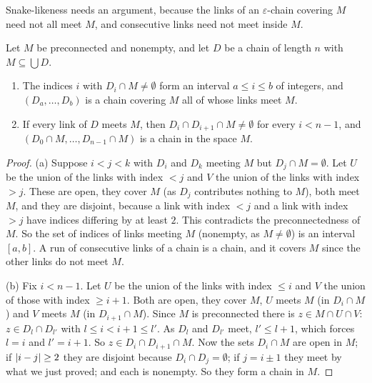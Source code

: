 
Snake-likeness needs an argument, because the links of an $\varepsilon$-chain covering $M$ need not
all meet $M$, and consecutive links need not meet inside $M$.

\begin{lemma}\label{lem:cover-meeting}
Let $M$ be preconnected and nonempty, and let $D$ be a chain of length $n$ with $M\subseteq\bigcup D$.
\begin{enumerate}[label=(\alph*)]
\item The indices $i$ with $D_i\cap M\neq\emptyset$ form an interval $a\le i\le b$ of integers, and
$(D_a,\dots,D_b)$ is a chain covering $M$ all of whose links meet $M$.
\item If every link of $D$ meets $M$, then $D_i\cap D_{i+1}\cap M\neq\emptyset$ for every $i<n-1$, and
$(D_0\cap M,\dots,D_{n-1}\cap M)$ is a chain in the space $M$.
\end{enumerate}
\end{lemma}

\begin{proof}
(a) Suppose $i<j<k$ with $D_i$ and $D_k$ meeting $M$ but $D_j\cap M=\emptyset$. Let $U$ be the union of
the links with index $<j$ and $V$ the union of the links with index $>j$. These are open, they cover
$M$ (as $D_j$ contributes nothing to $M$), both meet $M$, and they are disjoint, because a link with
index $<j$ and a link with index $>j$ have indices differing by at least $2$. This contradicts the
preconnectedness of $M$. So the set of indices of links meeting $M$ (nonempty, as $M\ne\emptyset$) is an
interval $[a,b]$. A run of consecutive links of a chain is a chain, and it covers $M$ since the other
links do not meet $M$.

(b) Fix $i<n-1$. Let $U$ be the union of the links with index $\le i$ and $V$ the union of those with
index $\ge i+1$. Both are open, they cover $M$, $U$ meets $M$ (in $D_i\cap M$) and $V$ meets $M$ (in
$D_{i+1}\cap M$). Since $M$ is preconnected there is $z\in M\cap U\cap V$: $z\in D_l\cap D_{l'}$ with
$l\le i<i+1\le l'$. As $D_l$ and $D_{l'}$ meet, $l'\le l+1$, which forces $l=i$ and $l'=i+1$. So
$z\in D_i\cap D_{i+1}\cap M$. Now the sets $D_i\cap M$ are open in $M$; if $\left\lvert i-j\right\rvert\ge2$ they are
disjoint because $D_i\cap D_j=\emptyset$; if $j=i\pm1$ they meet by what we just proved; and each is
nonempty. So they form a chain in $M$.
\end{proof}

